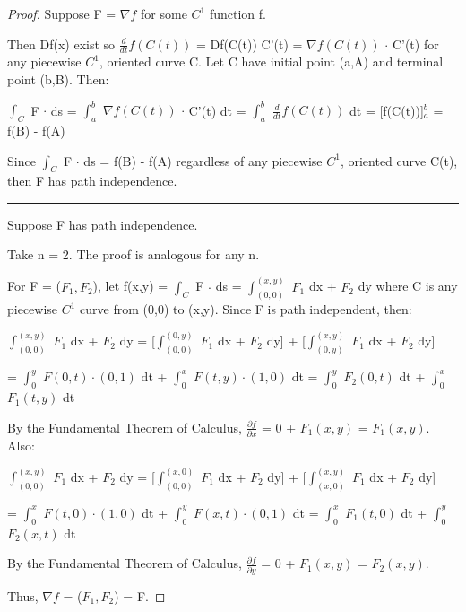     \begin{proof}
        Suppose F = $\nabla f$ for some $C^1$ function f.

        Then Df(x) exist so
        $\frac{d}{dt} f(C(t))$ = Df(C(t)) C'(t) = $\nabla f(C(t))$ $\cdot$ C'(t)
        for any piecewise $C^1$, oriented curve C.
        Let C have initial point (a,A) and terminal point (b,B). Then:

        \hspace{0.5cm}
        $\int_C$ F $\cdot$ ds
        = $\int_a^b$ $\nabla f(C(t))$ $\cdot$ C'(t) dt
        = $\int_a^b$ $\frac{d}{dt} f(C(t))$ dt
        = [f(C(t))]$_a^b$
        = f(B) - f(A)

        Since $\int_C$ F $\cdot$ ds = f(B) - f(A) regardless of
        any piecewise $C^1$, oriented curve C(t), then F has path independence.

        \rule[0.1cm]{15.1cm}{0.01cm}

        Suppose F has path independence.

        Take n = 2. The proof is analogous for any n.

        For F = ($F_1,F_2$), let
        f(x,y)
        = $\int_C$ F $\cdot$ ds
        = $\int_{(0,0)}^{(x,y)}$ $F_1$ dx + $F_2$ dy
        where C is any piecewise $C^1$ curve from (0,0) to (x,y).
        Since F is path independent, then:

        \hspace{0.5cm}
        $\int_{(0,0)}^{(x,y)}$ $F_1$ dx + $F_2$ dy
        = [$\int_{(0,0)}^{(0,y)}$ $F_1$ dx + $F_2$ dy]
            + [$\int_{(0,y)}^{(x,y)}$ $F_1$ dx + $F_2$ dy]

        \hspace{0.5cm}
        = $\int_0^y$ $F(0,t) \cdot (0,1)$ dt + $\int_0^x$ $F(t,y) \cdot (1,0)$ dt
        = $\int_0^y$ $F_2(0,t)$ dt + $\int_0^x$ $F_1(t,y)$ dt

        By the Fundamental Theorem of Calculus,
        $\frac{\partial f}{\partial x}$ = 0 + $F_1(x,y)$ = $F_1(x,y)$.
        Also:

        \hspace{0.5cm}
        $\int_{(0,0)}^{(x,y)}$ $F_1$ dx + $F_2$ dy
        = [$\int_{(0,0)}^{(x,0)}$ $F_1$ dx + $F_2$ dy]
            + [$\int_{(x,0)}^{(x,y)}$ $F_1$ dx + $F_2$ dy]

        \hspace{0.5cm}
        = $\int_0^x$ $F(t,0) \cdot (1,0)$ dt + $\int_0^y$ $F(x,t) \cdot (0,1)$ dt
        = $\int_0^x$ $F_1(t,0)$ dt + $\int_0^y$ $F_2(x,t)$ dt

        By the Fundamental Theorem of Calculus,
        $\frac{\partial f}{\partial y}$ = 0 + $F_1(x,y)$ = $F_2(x,y)$.

        Thus, $\nabla f$ = ($F_1,F_2$) = F.
    \end{proof}

